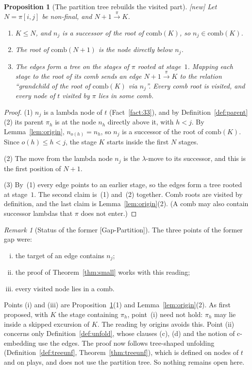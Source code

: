\documentclass[11pt]{article}
\newcommand{\iv}[2]{\pi[#1,#2]}
\newcommand{\comb}{\mathrm{comb}}
\newcommand{\ra}[1]{\xrightarrow{#1}}
\newcommand{\New}{\textsf{[new]}}
\theoremstyle{plain}
\newtheorem{proposition}[theorem]{Proposition}
\theoremstyle{definition}
\theoremstyle{remark}
\newtheorem{remark}[theorem]{Remark}
\begin{document}
\begin{proposition}[The partition tree rebuilds the visited part]\label{prop:ptree}
\New{} Let $N=\iv ij$ be non-final, and $N+1\ra\pi K$.
\begin{enumerate}
\item $K\le N$, and $n_j$ is a successor of the root of $\comb(K)$, so
  $n_j\in\comb(K)$.
\item The root of $\comb(N+1)$ is the node directly below $n_j$.
\item The edges form a tree on the stages of $\pi$ rooted at stage~$1$.
  Mapping each stage to the root of its comb sends an edge
  $N+1\ra\pi K$ to the relation ``grandchild of the root of
  $\comb(K)$ via $n_j$''.  Every comb root is visited, and every node of
  $t$ visited by $\pi$ lies in some comb.
\end{enumerate}
\end{proposition}
\begin{proof}
(1) $n_j$ is a lambda node of $t$ (Fact~\ref{fact:33}), and by
Definition~\ref{def:parent}(2) its parent $\pi_h$ is at the node $n_h$
directly above it, with $h<j$.  By Lemma~\ref{lem:origin},
$n_{o(h)}=n_h$, so $n_j$ is a successor of the root of $\comb(K)$.
Since $o(h)\le h<j$, the stage $K$ starts inside the first $N$ stages.

(2) The move from the lambda node $n_j$ is the $\lambda$-move to its
successor, and this is the first position of $N+1$.

(3) By~(1) every edge points to an earlier stage, so the edges form a
tree rooted at stage~$1$.  The second claim is~(1) and~(2) together.
Comb roots are visited by definition, and the last claim is
Lemma~\ref{lem:origin}(2).  (A comb may also contain successor lambdas
that $\pi$ does not enter.)
\end{proof}

\begin{remark}[Status of the former \textup{[Gap-Partition]}]\label{rem:ptreeclosed}
\label{gap:ptree}
The three points of the former gap were:
\begin{enumerate}[(i)]
\item the target of an edge contains $n_j$;
\item the proof of Theorem~\ref{thm:small} works with this reading;
\item every visited node lies in a comb.
\end{enumerate}
Points (i) and (iii) are Proposition~\ref{prop:ptree}(1) and
Lemma~\ref{lem:origin}(2).  As first proposed, with $K$ the stage
containing $\pi_h$, point~(i) need not hold: $\pi_h$ may lie inside a
skipped excursion of $K$.  The reading by origins avoids this.  Point
(ii) concerns only Definition~\ref{def:unfold}, whose clauses (c),
(d) and the notion of c-embedding use the edges.  The proof now
follows tree-shaped unfolding (Definition~\ref{def:treeunf},
Theorem~\ref{thm:treeunf}), which is defined on nodes of $t$ and on
plays, and does not use the partition tree.  So nothing remains open
here.
\end{remark}
\end{document}
